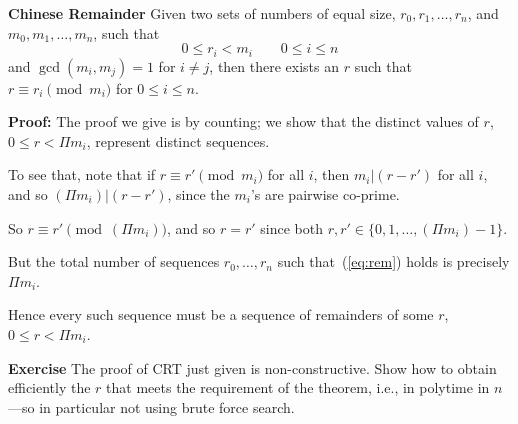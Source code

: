 \begin{frame}

{\bf Chinese Remainder}
Given two sets of numbers of equal size,
$r_0,r_1,\ldots,r_n$, and $m_0,m_1,\ldots,m_n$, such that
\begin{equation}\label{eq:rem}
0\le r_i<m_i \qquad 0\le i\le n
\end{equation}
and $\gcd(m_i,m_j)=1$ for $i\neq j$, then there exists an $r$ such
that $r\equiv r_i\pmod{m_i}$ for $0\le i\le n$.

\end{frame}

\begin{frame}

{\bf Proof:}
The proof we give is by counting; we show that the distinct values of
$r$, $0\le r<\Pi m_i$, represent distinct sequences.   

To see that,
note that if $r\equiv r'\pmod{m_i}$ for all $i$, then $m_i|(r-r')$ for
all $i$, and so $(\Pi m_i)|(r-r')$, since the $m_i$'s are pairwise
co-prime.  

So $r\equiv r'\pmod{(\Pi m_i)}$, and so $r=r'$ since both
$r,r'\in\{0,1,\ldots,(\Pi m_i)-1\}$.

But the total number of sequences $r_0,\ldots,r_n$ such
that~(\ref{eq:rem}) holds is precisely $\Pi m_i$.  

Hence every such sequence must be a sequence of remainders of some
$r$, $0\le r<\Pi m_i$.
\end{frame}

\begin{frame}

{\bf Exercise}
The proof of CRT just given is non-constructive.
Show how to obtain efficiently the $r$ that meets the requirement of
the theorem, i.e., in polytime in $n$---so in particular not using
brute force search.

\end{frame}

